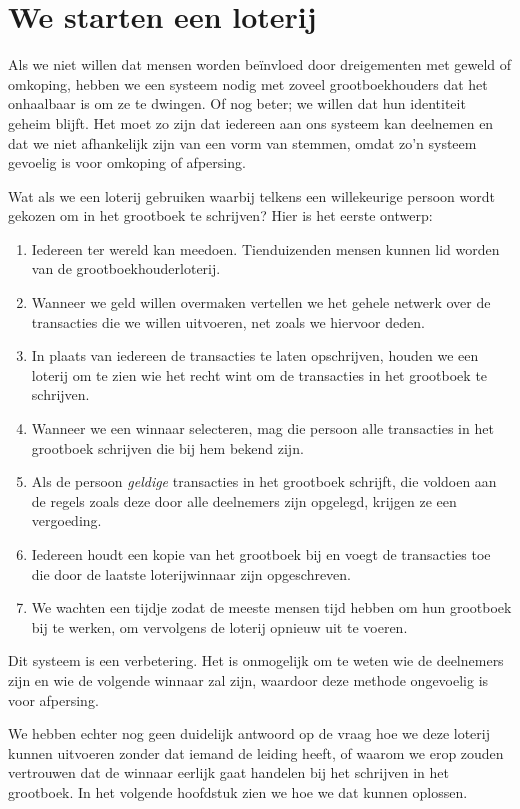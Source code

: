 \documentclass[smalldemyvopaper,11pt,twoside,onecolumn,openright,extrafontsizes]{memoir}
\begin{document}
\section{We starten een loterij}

Als we niet willen dat mensen worden beïnvloed door dreigementen met geweld of omkoping, hebben we een systeem nodig met zoveel grootboekhouders dat het onhaalbaar is om ze te dwingen. Of nog beter; we willen dat hun identiteit geheim blijft. Het moet zo zijn dat iedereen aan ons systeem kan deelnemen en dat we niet afhankelijk zijn van een vorm van stemmen, omdat zo'n systeem gevoelig is voor omkoping of afpersing.

Wat als we een loterij gebruiken waarbij telkens een willekeurige persoon wordt gekozen om in het grootboek te schrijven? Hier is het eerste ontwerp:

\begin{enumerate}
    \item Iedereen ter wereld kan meedoen. Tienduizenden mensen kunnen lid worden van de grootboekhouderloterij.
    \item Wanneer we geld willen overmaken vertellen we het gehele netwerk over de transacties die we willen uitvoeren, net zoals we hiervoor deden.
    \item In plaats van iedereen de transacties te laten opschrijven, houden we een loterij om te zien wie het recht wint om de transacties in het grootboek te schrijven.
    \item Wanneer we een winnaar selecteren, mag die persoon alle transacties in het grootboek schrijven die bij hem bekend zijn.
    \item Als de persoon \textit{geldige} transacties in het grootboek schrijft, die voldoen aan de regels zoals deze door alle deelnemers zijn opgelegd, krijgen ze een vergoeding.
    \item Iedereen houdt een kopie van het grootboek bij en voegt de transacties toe die door de laatste loterijwinnaar zijn opgeschreven.
    \item We wachten een tijdje zodat de meeste mensen tijd hebben om hun grootboek bij te werken, om vervolgens de loterij opnieuw uit te voeren.
\end{enumerate}

Dit systeem is een verbetering. Het is onmogelijk om te weten wie de deelnemers zijn en wie de volgende winnaar zal zijn, waardoor deze methode ongevoelig is voor afpersing.

We hebben echter nog geen duidelijk antwoord op de vraag hoe we deze loterij kunnen uitvoeren zonder dat iemand de leiding heeft, of waarom we erop zouden vertrouwen dat de winnaar eerlijk gaat handelen bij het schrijven in het grootboek. In het volgende hoofdstuk zien we hoe we dat kunnen oplossen.
\end{document}
